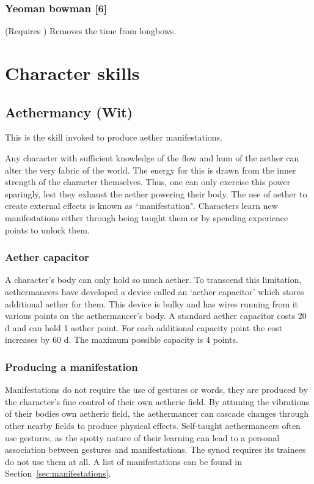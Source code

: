 \documentclass[a4paper,11pt,oneside]{book}
\newcommand{\textlf}[1]{\textbf{\titlecap{#1}}}
\begin{document}
\subsection{Yeoman bowman [6]}
(Requires \textlf{Weapon proficiency: bows}) Removes the \textlf{reload} time from longbows. 
 





\chapter{Character skills}

\section{Aethermancy (Wit)}
\label{sec:aethermancy}
This is the skill invoked to produce aether manifestations. 

Any character with sufficient knowledge of the flow and hum of the aether can alter the very fabric of the world.  The energy for this is drawn from the inner strength of the character themselves. Thus, one can only exercise this power sparingly, lest they exhaust the aether powering their body. The use of aether to create external effects is known as ``manifestation". Characters learn new manifestations either through being taught them or by spending experience points to unlock them.

\subsection{Aether capacitor}
\label{sec:capacitor}
A character's body can only hold so much aether. To transcend this limitation, aethermancers have developed a device called an `aether capacitor' which stores additional aether for them. This device is bulky and has wires running from it various points on the aethermancer's body. A standard aether capacitor costs 20 d and can hold 1 aether point. For each additional capacity point the cost increases by 60 d. The maximum possible capacity is 4 points.


\subsection{Producing a manifestation}
Manifestations do not require the use of gestures or words, they are produced by the character's fine control of their own aetheric field. By attuning the vibrations of their bodies own aetheric field, the aethermancer can cascade changes through other nearby fields to produce physical effects. Self-taught aethermancers often use gestures, as the spotty nature of their learning can lead to a personal association between gestures and manifestations. The synod requires its trainees do not use them at all. A list of manifestations can be found in Section~\ref{sec:manifestations}.
\end{document}
